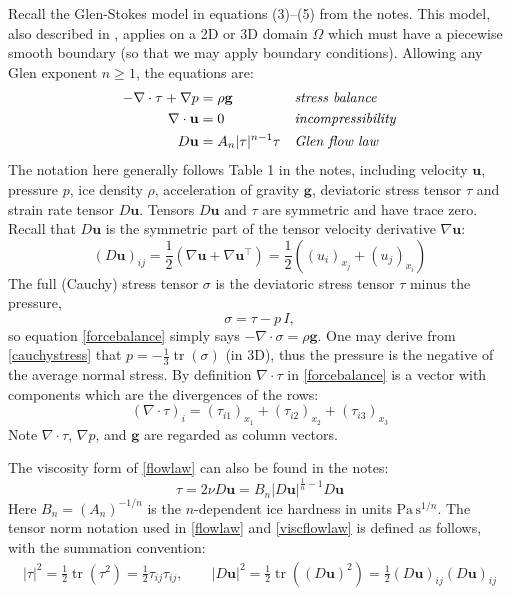 \documentclass[letterpaper,final,12pt,reqno]{amsart}
\newcommand{\grad}{\nabla}
\newcommand{\Div}{\nabla\cdot}
\newcommand{\trace}{\operatorname{tr}}
\newcommand{\bg}{\mathbf{g}}
\newcommand{\bu}{\mathbf{u}}
\begin{document}
Recall the Glen-Stokes model in equations (3)--(5) from the notes.  This model, also described in \cite{GreveBlatter2009,JouvetRappaz2011}, applies on a 2D or 3D domain $\Omega$ which must have a piecewise smooth boundary (so that we may apply boundary conditions).  Allowing any Glen exponent $n\ge 1$, the equations are:
\begin{align}
- \nabla \cdot \tau + \nabla p &= \rho \bg &&\text{\emph{stress balance}} \label{forcebalance} \\
\nabla \cdot \bu &= 0 &&\text{\emph{incompressibility}} \label{incompressible} \\
D\bu &= A_n |\tau|^{n-1} \tau &&\text{\emph{Glen flow law}} \label{flowlaw}
\end{align}
The notation here generally follows Table 1 in the notes, including velocity $\bu$, pressure $p$, ice density $\rho$, acceleration of gravity $\bg$, deviatoric stress tensor $\tau$ and strain rate tensor $D\bu$.  Tensors $D\bu$ and $\tau$ are symmetric and have trace zero.  Recall that $D\bu$ is the symmetric part of the tensor velocity derivative $\grad \bu$:
\begin{equation}
(D\bu)_{ij} = \frac{1}{2} \left(\grad\bu + \grad\bu^\top\right) = \frac{1}{2} \left((u_i)_{x_j} + (u_j)_{x_i}\right) \label{strainrate}
\end{equation}
The full (Cauchy) stress tensor $\sigma$ is the deviatoric stress tensor $\tau$ minus the pressure,
\begin{equation}
    \sigma = \tau - p\,I,  \label{cauchystress}
\end{equation}
so equation \eqref{forcebalance} simply says $-\Div \sigma = \rho \bg$.  One may derive from \eqref{cauchystress} that $p = -\frac{1}{3} \trace(\sigma)$ (in 3D), thus the pressure is the negative of the average normal stress.  By definition $\Div\tau$ in \eqref{forcebalance} is a vector with components which are the divergences of the rows:
\begin{equation}
    \left(\nabla \cdot \tau\right)_i = \left(\tau_{i1}\right)_{x_1} + \left(\tau_{i2}\right)_{x_2} + \left(\tau_{i3}\right)_{x_3}  \label{divtaudefn}
\end{equation}
Note $\nabla\cdot \tau$, $\nabla p$, and $\bg$ are regarded as column vectors.

The viscosity form of \eqref{flowlaw} can also be found in the notes:
\begin{equation}
\tau = 2\nu D\bu = B_n |D\bu|^{\frac{1}{n} - 1} D\bu  \label{viscflowlaw}
\end{equation}
Here $B_n = (A_n)^{-1/n}$ is the $n$-dependent ice hardness in units $\text{Pa}\,\text{s}^{1/n}$.  The tensor norm notation used in \eqref{flowlaw}  and \eqref{viscflowlaw} is defined as follows, with the summation convention:
\begin{align*}
|\tau|^2 = \frac{1}{2} \trace\left(\tau^2\right) = \frac{1}{2} \tau_{ij} \tau_{ij}, \qquad |D\bu|^2 = \frac{1}{2} \trace\left((D\bu)^2\right) = \frac{1}{2} (D\bu)_{ij} (D\bu)_{ij}
\end{align*}
\end{document}
